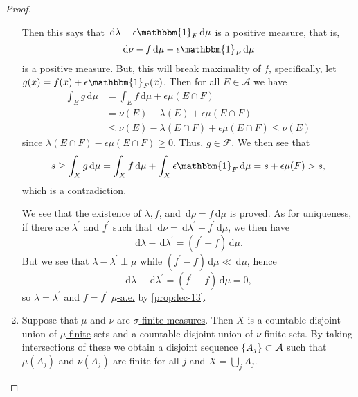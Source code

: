 \begin{proof}
\begin{enumerate}
\begin{explanation}
			      Then this says that \(\,\mathrm{d} \lambda - \epsilon \mathbbm{1}_{F} \,\mathrm{d} \mu\) is a \hyperref[def:signed-measure]{positive measure}, that is,
			      \[
				      \,\mathrm{d} \nu - f \,\mathrm{d} \mu - \epsilon \mathbbm{1}_{F} \,\mathrm{d} \mu
			      \]
			      is a \hyperref[def:signed-measure]{positive measure}. But, this will break maximality of \(f\), specifically, let
			      \(g(x) = f(x) + \epsilon \mathbbm{1}_{F} (x)\). Then for all \(E \in \mathcal{A}\) we have
			      \[
				      \begin{split}
					      \int_E g \,\mathrm{d} \mu & = \int_E f \,\mathrm{d} \mu + \epsilon\mu(E \cap F)                 \\
					      &= \nu(E) - \lambda(E) + \epsilon \mu(E \cap F)                      \\
					      &\leq \nu(E) - \lambda(E \cap F) + \epsilon\mu(E \cap F) \leq \nu(E)
				      \end{split}
			      \]
			      since \(\lambda(E \cap F) - \epsilon\mu(E \cap F) \geq 0\). Thus, \(g \in \mathscr{F}\). We then see that
			      \[
				      s \geq \int_X g \,\mathrm{d} \mu  = \int_X f \,\mathrm{d} \mu + \int_X \epsilon \mathbbm{1}_{F} \,\mathrm{d} \mu = s + \epsilon\mu(F) > s,
			      \]
			      which is a contradiction.
		      \end{explanation}
		      We see that the existence of \(\lambda , f\), and \(\,\mathrm{d} \rho = f \,\mathrm{d} \mu \) is proved. As for uniqueness,
		      if there are \(\lambda ^\prime \) and \(f^\prime \) such that \(\,\mathrm{d} \nu = \,\mathrm{d} \lambda ^\prime + f^\prime \,\mathrm{d} \mu \),
		      we then have
		      \[
			      \,\mathrm{d} \lambda - \,\mathrm{d} \lambda ^\prime = (f^\prime -f)\,\mathrm{d} \mu .
		      \]
		      But we see that \(\lambda -\lambda ^\prime \perp \mu \) while \((f^\prime -f)\,\mathrm{d} \mu \ll \,\mathrm{d} \mu \), hence
		      \[
			      \,\mathrm{d} \lambda -\,\mathrm{d} \lambda ^\prime = (f^\prime -f)\,\mathrm{d} \mu = 0,
		      \]
		      so \(\lambda = \lambda ^\prime \) and \(f = f^\prime \) \hyperref[def:mu-almost-everywhere]{\(\mu \)-a.e.} by \autoref{prop:lec-13}.
		\item Suppose that \(\mu \) and \(\nu \) are \hyperref[def:finite-signed-measure]{\(\sigma\)-finite measures}. Then \(X\) is a countable disjoint union of
		      \hyperref[def:locally-finite]{\(\mu \)-finite} sets and a countable disjoint union of \(\nu \)-finite sets. By taking intersections of these we obtain
		      a disjoint sequence \(\{A_j\}\subset \mathcal{\MakeUppercase{a}} \) such that \(\mu (A_{j} )\) and \(\nu (A_{j} )\) are finite for all \(j\) and \(X = \bigcup_{j} A_{j} \).

\end{enumerate}
\end{proof}
